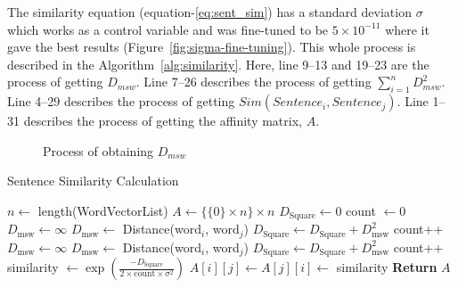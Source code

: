 The similarity equation (equation-\ref{eq:sent_sim}) has a standard deviation $\sigma$ which works as a control variable and was fine-tuned to be $5\times10^{-11}$ where it gave the best results (Figure~\ref{fig:sigma-fine-tuning}). This whole process is described in the Algorithm~\ref{alg:similarity}. Here, line 9--13 and 19--23 are the process of getting $D_{msw}$. Line 7--26 describes the process of getting $\sum^n_{i=1}D_{msw}^2$. Line 4--29 describes the process of getting $Sim(Sentence_i,Sentence_j)$. Line 1--31 describes the process of getting the affinity matrix, $A$.

\begin{figure}
    \centering
    
    \caption{Process of obtaining $D_{msw}$}
    \label{fig:msd}
\end{figure}
\begin{algorithm} \caption{Sentence Similarity Calculation} \label{alg:similarity}
\begin{algorithmic}[1]
    \State $n \gets$ length(WordVectorList)
    \State $A \gets \{ \{0\} \times n \} \times n$
        \State $D_{\text{Square}} \gets 0$
        \State count $\gets 0$
                \State $D_{\text{msw}} \gets \infty$
                        \State $D_{\text{msw}} \gets$ Distance(word$_i$, word$_j$)
                    \EndIf
                \EndFor
                \State $D_{\text{Square}} \gets D_{\text{Square}} + D_{\text{msw}}^2$
                \State count++
            \EndFor
                \State $D_{\text{msw}} \gets \infty$
                        \State $D_{\text{msw}} \gets$ Distance(word$_i$, word$_j$)
                    \EndIf
                \EndFor
                \State $D_{\text{Square}} \gets D_{\text{Square}} + D_{\text{msw}}^2$
                \State count++
            \EndFor
            \State similarity $\gets \exp \left( \frac{- D_{\text{Square}}}{2 \times \text{count} \times \sigma^2} \right)$
            \State $A[i][j] \gets A[j][i] \gets$ similarity
        \EndFor
    \EndFor
    \State \textbf{Return} $A$
\end{algorithmic}
\end{algorithm}

